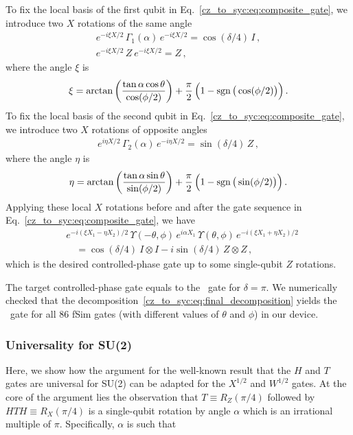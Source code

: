 To fix the local basis of the first qubit in Eq.~\eqref{cz_to_syc:eq:composite_gate}, we introduce two $X$ rotations of the same angle
\begin{gather}
 e^{-i\xi X/2}\, \Gamma_1(\alpha)\, e^{-i\xi X/2} = \cos(\delta/4)\,I\,,\\[2pt]
  e^{-i\xi X/2}\, Z\:  e^{-i\xi X/2}=  Z\,,
\end{gather}
where the angle $\xi$ is 
\begin{align}
 \xi = \arctan \bigg(\frac{\tan\alpha \cos\theta}{\cos(\phi/2)}\bigg) + \frac{\pi}{2}\, \Big(1-\operatorname{sgn}\big(\cos(\phi/2)\big)\Big)\,.
\end{align}
To fix the local basis of the second qubit in Eq.~\eqref{cz_to_syc:eq:composite_gate}, we introduce two $X$ rotations of opposite angles
\begin{align}
 e^{i\eta X/2}\, \Gamma_2(\alpha)\, e^{-i\eta X/2}= \sin(\delta/4)\,Z\,,
\end{align}
where the angle $\eta$ is
\begin{align}
\eta = \arctan \bigg(\frac{\tan\alpha \sin\theta}{\sin(\phi/2)}\bigg) + \frac{\pi}{2}\, \Big(1-\operatorname{sgn}\big(\sin(\phi/2)\big)\Big)\,.
\end{align}
Applying these local $X$ rotations before and after the gate sequence in Eq.~\eqref{cz_to_syc:eq:composite_gate}, we have
\begin{align}
 & e^{-i(\xi X_1 - \eta X_2)/2}\,\Upsilon(-\theta, \phi)\, e^{i\alpha X_1}\, \Upsilon(\theta, \phi)\, e^{-i(\xi X_1 + \eta X_2)/2}\nonumber\\[2pt]
 & \quad= \cos(\delta/4)\: I \otimes I - i\sin(\delta/4)\, Z\otimes Z\,,\label{cz_to_syc:eq:final_decomposition}
\end{align}
which is the desired controlled-phase gate up to some single-qubit $Z$ rotations.  

The target controlled-phase gate equals to the \CZ\ gate for $\delta = \pi$.  We numerically checked that the decomposition~\eqref{cz_to_syc:eq:final_decomposition} yields the \CZ\ gate for all 86 {\rm fSim} gates (with different values of $\theta$ and $\phi$) in our device.

\subsubsection{Universality for {\rm SU(2)}}

Here, we show how the argument for the well-known result that the $H$ and $T$ gates are universal for {\rm SU}(2) \cite{Boykin1999OnUniversal} can be adapted for the $X^{1/2}$ and $W^{1/2}$ gates. At the core of the argument lies the observation that $T \equiv R_Z(\pi / 4)$ followed by $HTH \equiv R_X(\pi / 4)$ is a single-qubit rotation by angle $\alpha$ which is an irrational multiple of $\pi$. Specifically, $\alpha$ is such that

